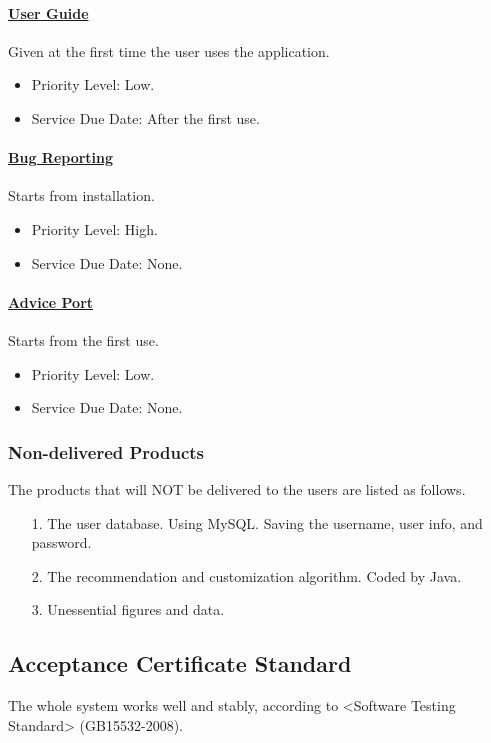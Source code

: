 \documentclass[10pt]{article}
\begin{document}
\paragraph{\underline{User Guide}} Given at the first time the user uses the application.

\begin{itemize}
	\item Priority Level: Low.
	\item Service Due Date: After the first use.
\end{itemize}

\paragraph{\underline{Bug Reporting}} Starts from installation.

\begin{itemize}
	\item Priority Level: High.
	\item Service Due Date: None.
\end{itemize}

\paragraph{\underline{Advice Port}} Starts from the first use.

\begin{itemize}
	\item Priority Level: Low.
	\item Service Due Date: None.
\end{itemize}

\subsubsection{Non-delivered Products}
The products that will NOT be delivered to the users are listed as follows.

\begin{itemize}
	\item[1.] The user database. Using MySQL. Saving the username, user info, and password.
	\item[2.] The recommendation and customization algorithm. Coded by Java. 
	\item[3.] Unessential figures and data.
\end{itemize}

\subsection{Acceptance Certificate Standard}
The whole system works well and stably, according to <Software Testing Standard> (GB15532-2008).
\end{document}
